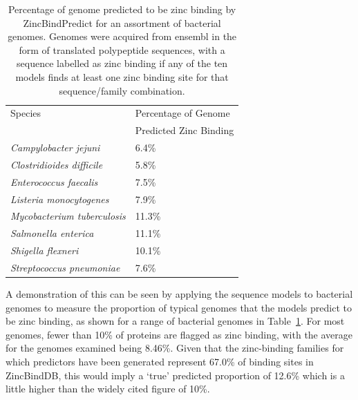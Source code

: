 \begin{table}
  \caption[Percentage of genome predicted to be zinc binding by ZincBindPredict for an assortment of bacterial genomes.]{\label{tab:genome}Percentage of genome predicted to be zinc
    binding by ZincBindPredict for an assortment of bacterial
    genomes. Genomes were acquired from ensembl
    \cite{yates2020ensembl} in the form of translated polypeptide
    sequences, with a sequence labelled as zinc binding if any of the
    ten models finds at least one zinc binding site for that
    sequence/family combination.}
\begin{center}
\begin{tabular}{ll} \hline
Species                          & Percentage of Genome   \\
                                 & Predicted Zinc Binding \\ \hline
{\it Campylobacter jejuni}       & 6.4\%                  \\
{\it Clostridioides difficile}   & 5.8\%                  \\
{\it Enterococcus faecalis}      & 7.5\%                  \\
{\it Listeria monocytogenes}     & 7.9\%                  \\
{\it Mycobacterium tuberculosis} & 11.3\%                 \\
{\it Salmonella enterica}        & 11.1\%                 \\
{\it Shigella flexneri}          & 10.1\%                 \\ 
{\it Streptococcus pneumoniae}   & 7.6\%                  \\ \hline

\end{tabular}
\end{center}
\end{table}

A demonstration of this can be seen by applying the sequence models to bacterial genomes to measure the proportion of typical genomes that the models predict to be zinc binding, as shown for a range of bacterial genomes in Table~\ref{tab:genome}. For most genomes, fewer than 10\% of proteins are flagged as zinc binding, with the average for the genomes examined being 8.46\%. Given that the zinc-binding families for which predictors have been generated represent 67.0\% of binding sites in ZincBindDB, this would imply a `true' predicted proportion of 12.6\% which is a little higher than the widely cited figure of 10\%.

